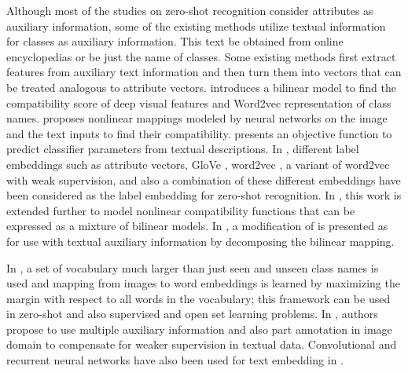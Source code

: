 \documentclass[letterpaper]{article}
\begin{document}
 Although most of the studies on zero-shot recognition consider attributes as auxiliary information, some of the existing methods utilize textual
  information for classes as auxiliary information.
  This text be obtained from online encyclopedias or be just the name of classes.
   Some existing methods first extract features from auxiliary text information and then turn them into vectors that can be treated analogous to attribute vectors.
 \cite{devise} introduces a bilinear model to find the compatibility score of deep visual features and Word2vec \cite{word2vec} representation of class names. \cite{ba2015} proposes nonlinear mappings modeled by neural networks on the image and the text inputs to find their compatibility.
  \cite{mohamed13} presents an objective function to predict classifier parameters from textual descriptions. In \cite{Akata2015}, different label embeddings such as attribute vectors, GloVe \cite{pennington2014glove}, word2vec \cite{word2vec}, a variant of word2vec with weak supervision, and also a combination of these different embeddings have been considered as the label embedding for zero-shot recognition. In \cite{Xian2016}, this work is extended further to model nonlinear compatibility
   functions that can be expressed as a mixture of bilinear models.
  In \cite{Qiao2016}, a modification of \cite{emb15} is presented as for use with textual auxiliary information by decomposing the bilinear mapping.

In \cite{Fu2016}, a set of vocabulary much larger than just seen and unseen class names is used and mapping from images to word embeddings is learned
by  maximizing the margin with respect to all words in the vocabulary; this framework can be used in zero-shot and also supervised and open set learning problems.
In  \cite{Akata2016}, authors propose to use multiple auxiliary information and also  part annotation in image domain to compensate for weaker supervision in textual data.
Convolutional and recurrent neural networks  have also been used for text embedding in \cite{Akata2016rnn}.
\end{document}
